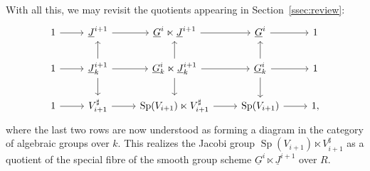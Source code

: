 \documentclass[10pt]{amsart}
\theoremstyle{plain}
\theoremstyle{definition}
\newcommand{\Fq}{k}
\newcommand{\Sp}{{\operatorname{Sp}}}
\begin{document}
With all this, we may revisit the quotients appearing in Section~\ref{ssec:review}:
\[
\begin{tikzcd}
1 \arrow{r} & \underline{J}^{i+1}  \arrow{r} & \underline{G}^i \ltimes \underline{J}^{i+1} \arrow{r} & \underline{G}^i \arrow{r}  & 1\\
1 \arrow{r} & \underline{J}^{i+1}_\Fq \arrow{d} \arrow{u} \arrow{r} & \underline{G}_\Fq^i \ltimes \underline{J}_\Fq^{i+1} \arrow{d} \arrow{u} \arrow{r} & \underline{G}_\Fq^i \arrow{r} \arrow{d} \arrow{u} & 1\\ 
1 \arrow{r} & V_{i+1}^\sharp \arrow{r} & \Sp(V_{i+1}) \ltimes V_{i+1}^\sharp \arrow{r} & \Sp(V_{i+1}) \arrow{r} & 1,
\end{tikzcd}
\]
where the last two rows are now understood as forming a diagram in the category of algebraic groups over $\Fq$. 
This realizes the Jacobi group $\Sp(V_{i+1}) \ltimes V_{i+1}^\sharp$ as a quotient of the special fibre of the smooth group scheme $\underline{G}^i \ltimes \underline{J}^{i+1}$ over $R$. 
\end{document}
